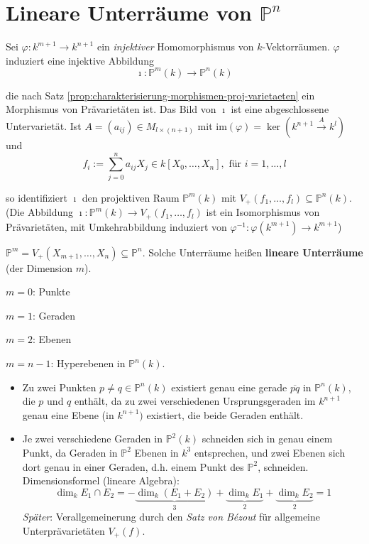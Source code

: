 
\section{Lineare Unterräume von $\mathbb{P}^{n}$}
\label{sec:lineare-unterraeume-von-pn}

Sei $\varphi:k^{m+1}\rightarrow k^{n+1}$ ein \emph{injektiver} Homomorphismus
von $k$-Vektorräumen. $\varphi$ induziert eine injektive Abbildung
\[
  \imath:\mathbb{P}^{m}(k)\rightarrow\mathbb{P}^{n}(k)
\]

die nach Satz \ref{prop:charakterisierung-morphismen-proj-varietaeten} ein Morphismus von Prävarietäten ist. Das Bild von
$\imath$ ist eine abgeschlossene Untervarietät. Ist $A=(a_{ij})\in M_{l\times(n+1)}$
mit $\text{im}(\varphi)=\ker(k^{n+1}\xrightarrow{A}k^{l})$ und
\[
  f_{i}:=\sum_{j=0}^{n}a_{ij}X_{j}\in k[X_{0},\ldots,X_{n}], \text{ für } i = 1, \ldots, l
\]

so identifiziert $\imath$ den projektiven Raum $\mathbb{P}^{m}(k)$ mit $V_{+}(f_{1},\ldots,f_{l}) \subseteq \mathbb{P}^{n}(k)$.
(Die Abbildung $\imath:\mathbb{P}^{m}(k)\rightarrow V_{+}(f_{1},\ldots,f_{l})$
ist ein Isomorphismus von Prävarietäten, mit Umkehrabbildung induziert von $\varphi^{-1}:\varphi(k^{m+1})\rightarrow k^{m+1}$)
\begin{example*}
  $\mathbb{P}^{m}=V_{+}(X_{m+1},\ldots,X_{n})\subseteq\mathbb{P}^{n}$.
  Solche Unterräume heißen \textbf{lineare Unterräume} (der Dimension
  $m$).

  $m=0$: Punkte

  $m=1$: Geraden

  $m=2$: Ebenen

  $m=n-1$: Hyperebenen in $\mathbb{P}^{n}(k)$.
  \begin{itemize}
  \item Zu zwei Punkten $p\neq q\in\mathbb{P}^{n}(k)$ existiert genau eine
    gerade $\overline{pq}$ in $\mathbb{P}^{n}(k)$, die $p$ und $q$
    enthält, da zu zwei verschiedenen Ursprungsgeraden im $k^{n+1}$ genau
    eine Ebene (in $k^{n+1})$ existiert, die beide Geraden enthält.
  \end{itemize}
\end{example*}
\begin{itemize}
\item Je zwei verschiedene Geraden in $\mathbb{P}^{2}(k)$ schneiden sich
  in genau einem Punkt, da Geraden in $\mathbb{P}^{2}$ Ebenen in $k^{3}$
  entsprechen, und zwei Ebenen sich dort genau in einer Geraden, d.h.
  einem Punkt des $\mathbb{P}^{2}$, schneiden. Dimensionsformel (lineare
  Algebra):
  \[
    \dim _{k}E_{1}\cap E_{2}=-\underbrace{\dim_{k} (E_{1}+E_{2})}_{3}+\underbrace{\dim_{k} E_{1}}_{2}+\underbrace{\dim_{k} E_{2}}_{2}=1
  \]
  \emph{Später}: Verallgemeinerung durch den \emph{Satz von Bézout} für allgemeine Unterprävarietäten
  $V_{+}(f)$.
\end{itemize}

